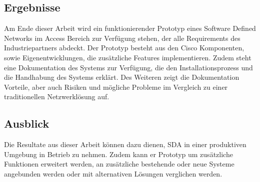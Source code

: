 \subsection{Ergebnisse}
Am Ende dieser Arbeit wird ein funktionierender Prototyp eines Software Defined Networks im Access Bereich zur Verfügung stehen, der alle Requirements des Industriepartners abdeckt. Der Prototyp besteht aus den Cisco Komponenten, sowie Eigenentwicklungen, die zusätzliche Features implementieren. 
Zudem steht eine Dokumentation des Systems zur Verfügung, die den Installationsprozess und die Handhabung des Systems erklärt. Des Weiteren zeigt die Dokumentation Vorteile, aber auch Risiken und mögliche Probleme im Vergleich zu einer traditionellen Netzwerklösung auf.
\subsection{Ausblick}
Die Resultate aus dieser Arbeit können dazu dienen, SDA in einer produktiven Umgebung in Betrieb zu nehmen. Zudem kann er Prototyp um zusätzliche Funktionen erweitert werden, an zusätzliche bestehende oder neue Systeme angebunden werden oder mit alternativen Lösungen verglichen werden.
